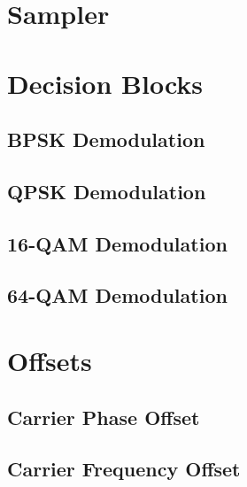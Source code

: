 \documentclass[]{article}
\begin{document}
\newpage
\section{Sampler}
\label{app:sampler}



\section{Decision Blocks}
\label{app:dblocks}
\subsection{BPSK Demodulation}
\label{app:bpsk_demod}


\newpage
\subsection{QPSK Demodulation}
\label{app:qpsk_demod}


\subsection{16-QAM Demodulation}
\label{app:qam_16_demod}


\newpage
\subsection{64-QAM Demodulation}
\label{app:qam_64_demod}


\newpage
\section{Offsets}
\label{app:offsets}
\subsection{Carrier Phase Offset}
\label{app:phase_offset}


\newpage
\subsection{Carrier Frequency Offset}
\label{app:freq_offset}

\end{document}
